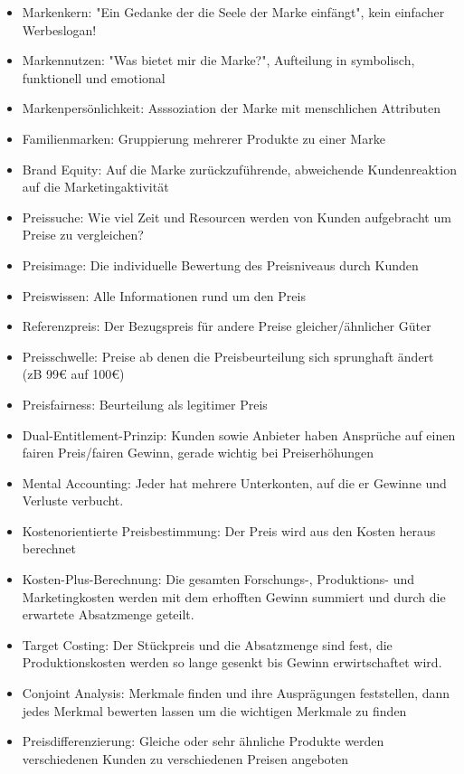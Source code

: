 \documentclass[]{article}
\begin{document}
\begin{itemize}
    \item Markenkern: "Ein Gedanke der die Seele der Marke einfängt", kein einfacher Werbeslogan!
    \item Markennutzen: "Was bietet mir die Marke?", Aufteilung in symbolisch, funktionell und emotional
    \item Markenpersönlichkeit: Asssoziation der Marke mit menschlichen Attributen
    \item Familienmarken: Gruppierung mehrerer Produkte zu einer Marke
    \item Brand Equity: Auf die Marke zurückzuführende, abweichende Kundenreaktion auf die Marketingaktivität
    \item Preissuche: Wie viel Zeit und Resourcen werden von Kunden aufgebracht um Preise zu vergleichen?
    \item Preisimage: Die individuelle Bewertung des Preisniveaus durch Kunden
    \item Preiswissen: Alle Informationen rund um den Preis
    \item Referenzpreis: Der Bezugspreis für andere Preise gleicher/ähnlicher Güter
    \item Preisschwelle: Preise ab denen die Preisbeurteilung sich sprunghaft ändert (zB 99€ auf 100€)
    \item Preisfairness: Beurteilung als legitimer Preis
    \item Dual-Entitlement-Prinzip: Kunden sowie Anbieter haben Ansprüche auf einen fairen Preis/fairen Gewinn, gerade wichtig bei Preiserhöhungen
    \item Mental Accounting: Jeder hat mehrere Unterkonten, auf die er Gewinne und Verluste verbucht.
    \item Kostenorientierte Preisbestimmung: Der Preis wird aus den Kosten heraus berechnet
    \item Kosten-Plus-Berechnung: Die gesamten Forschungs-, Produktions- und Marketingkosten werden mit dem erhofften Gewinn summiert und durch die erwartete Absatzmenge geteilt.
    \item Target Costing: Der Stückpreis und die Absatzmenge sind fest, die Produktionskosten werden so lange gesenkt bis Gewinn erwirtschaftet wird.
    \item Conjoint Analysis: Merkmale finden und ihre Ausprägungen feststellen, dann jedes Merkmal bewerten lassen um die wichtigen Merkmale zu finden
    \item Preisdifferenzierung: Gleiche oder sehr ähnliche Produkte werden verschiedenen Kunden zu verschiedenen Preisen angeboten

\end{itemize}
\end{document}
